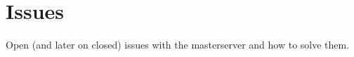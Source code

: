 \chapter{Issues}
\label{app:issues}
Open (and later on closed) issues with the masterserver and how to solve them.


